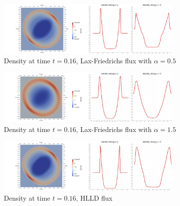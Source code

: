 	
	\begin{figure}[H]
		\begin{center}
			\includegraphics[width=0.82\textwidth]{img/numflux/lf2.jpg}
			\vspace{-3mm}
		\caption{Density at time $t = 0.16$, Lax-Friedrichs flux with $\alpha = 0.5$}
		\end{center}
	\end{figure}\vspace{-5mm}
	\begin{figure}[H]
		\begin{center}
			\includegraphics[width=0.82\textwidth]{img/numflux/lfw2.jpg}
			\vspace{-3mm}
		\caption{Density at time $t = 0.16$, Lax-Friedrichs flux with $\alpha = 1.5$}
		\end{center}
	\end{figure}\vspace{-5mm}
	\begin{figure}[H]
		\begin{center}
			\includegraphics[width=0.82\textwidth]{img/numflux/hl2.jpg}
			\vspace{-3mm}
		\caption{Density at time $t = 0.16$, HLLD flux}
		\end{center}
	\end{figure}\vspace{-5mm}
	\newpage
	
